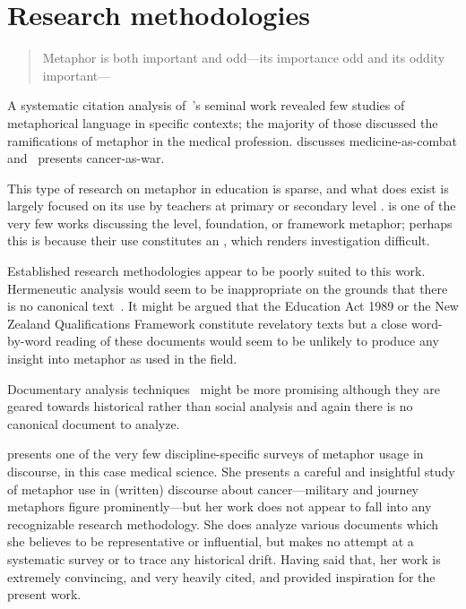 \section{Research methodologies}

\begin{singlespace}
\begin{quote}
  Metaphor is both important and odd---its importance odd and its
  oddity important---
\end{quote}
\end{singlespace}

A systematic citation analysis of~'s seminal work
revealed few studies of metaphorical language in specific contexts;
the majority of those discussed the ramifications of metaphor in the
medical profession.   discusses
medicine-as-combat and~ presents cancer-as-war.

This type of research on metaphor in education is sparse, and what
does exist is largely focused on its use by teachers at primary or
secondary level \citep{munby1986,cameron2003}.  
is one of the very few works discussing the level, foundation, or
framework metaphor; perhaps this is because their use constitutes an
, which renders investigation difficult.

Established research methodologies appear to be poorly suited to this
work.  Hermeneutic analysis would seem to be inappropriate on the
grounds that there is no canonical text~\parencite{mantzavinos2005}.
It might be argued that the Education Act 1989 or the New Zealand
Qualifications Framework constitute revelatory texts but a close
word-by-word reading of these documents would seem to be unlikely to
produce any insight into metaphor as used in the field.

Documentary analysis techniques~\parencite{fitzgerald2012} might be
more promising although they are geared towards historical rather than
social analysis and again there is no canonical document to analyze.

 presents one of the very few
discipline-specific surveys of metaphor usage in discourse, in this
case medical science.  She presents a careful and insightful study of
metaphor use in (written) discourse about cancer---military and
journey metaphors figure prominently---but her work does not appear to
fall into any recognizable research methodology.  She does analyze
various documents which she believes to be representative or
influential, but makes no attempt at a systematic survey or to trace
any historical drift.  Having said that, her work is extremely
convincing, and very heavily cited, and provided inspiration for the
present work.

